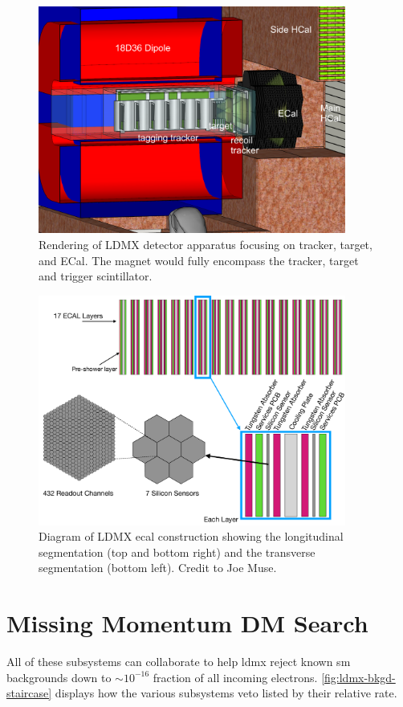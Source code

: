 \begin{figure}
  \centering
  \includegraphics[width=0.9\textwidth]{figures/ldmx/experiment/LDMX_FOA_CLOSE.PNG}
  \caption{
    Rendering of LDMX detector apparatus focusing on tracker, target, and ECal.
    The magnet would fully encompass the tracker, target and trigger scintillator.
  }
  \label{fig:ldmx-render}
\end{figure}

\begin{figure}
  \centering
  \includegraphics[width=0.9\textwidth]{figures/ldmx/experiment/ecal.pdf}
  \caption{
    Diagram of LDMX \ac{ecal} construction showing the longitudinal segmentation
    (top and bottom right) and the transverse segmentation (bottom left).
    Credit to Joe Muse.
  }
  \label{fig:ldmx-ecal}
\end{figure}

\section{Missing Momentum DM Search}
All of these subsystems can collaborate to help \ac{ldmx} reject known \ac{sm} backgrounds
down to $\sim 10^{-16}$ fraction of all incoming electrons. \cref{fig:ldmx-bkgd-staircase}
displays how the various subsystems veto listed by their relative rate.

